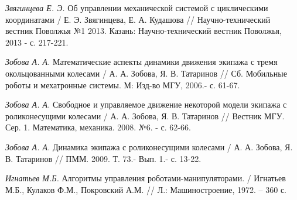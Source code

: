 \begin{thebibliography}{10}
	
	
	{\it Звягинцева Е. Э.} Об управлении механической системой с циклическими координатами / Е. Э. Звягинцева, Е. А. Кудашова //
	Научно-технический вестник Поволжья №1 2013. Казань: Научно-технический вестник Поволжья, 2013 - с. 217-221.
	
	
	{\it Зобова А. А.} Математические аспекты динамики движения экипажа с тремя окольцованными колесами / А. А. Зобова, Я. В. Татаринов //
	Сб. Мобильные роботы и мехатронные системы. М: Изд-во МГУ, 2006.- с. 61-67.
	
	{\it Зобова А. А.} Свободное и управляемое движение некоторой модели экипажа с роликонесущими колесами / А. А. Зобова, Я. В. Татаринов //
	Вестник МГУ. Сер. 1. Математика, механика. 2008. №6. - с. 62-66.
	
	{\it Зобова А. А.} Динамика экипажа с роликонесущими колесами / А. А. Зобова, Я. В. Татаринов //
	ПММ. 2009. Т. 73.- Вып. 1.- с. 13-22.
	
	{\it Игнатьев М.Б.} Алгоритмы управления роботами-манипуляторами. / Игнатьев М.Б., Кулаков Ф.М., Покровский А.М. //  Л.: Машиностроение, 1972. – 360 с.
	

\end{thebibliography}
